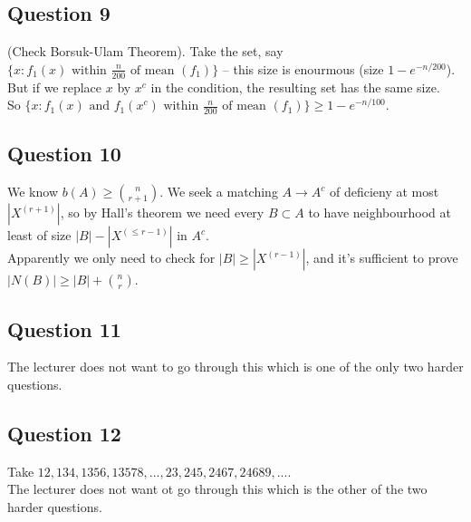 \documentclass[a4paper]{article}
\begin{document}
\subsection{Question 9}
(Check Borsuk-Ulam Theorem). Take the set, say $\{x:f_1(x) \text{ within } \frac{n}{200} \text{ of mean } (f_1)\}$ -- this size is enourmous (size $1-e^{-n/200}$). But if we replace $x$ by $x^c$ in the condition, the resulting set has the same size.\\
So $\{x:f_1(x) \text{ and } f_1(x^c) \text{ within } \frac{n}{200} \text{ of mean } (f_1)\} \geq 1-e^{-n/100}$.

\subsection{Question 10}
We know $b(A) \geq {n \choose {r+1}}$. We seek a matching $A \to A^c$ of deficieny at most $|X^{(r+1)}|$, so by Hall's theorem we need every $B\subset A$ to have neighbourhood at least of size $|B| - |X^{(\leq r-1)}|$ in $A^c$.\\
Apparently we only need to check for $|B| \geq |X^{(r-1)}|$, and it's sufficient to prove $|N(B)| \geq |B| + {n \choose r}$.

\subsection{Question 11}
The lecturer does not want to go through this which is one of the only two harder questions.

\subsection{Question 12}
Take $12,134,1356,13578,...,23,245,2467,24689,...$.\\
The lecturer does not want ot go through this which is the other of the two harder questions.
\end{document}

